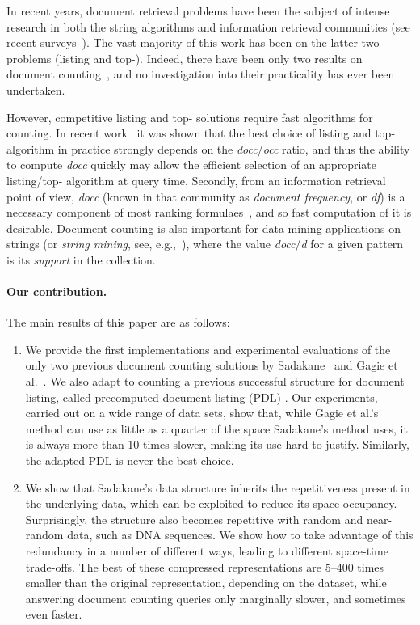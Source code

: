 \documentclass[11pt]{llncs}
\begin{document}
In recent years, document retrieval problems have been the subject of intense research in both the
string algorithms and information retrieval communities (see recent surveys~\cite{HPSTV13,NavACMcs14}). The vast majority of this work has been on the latter two problems (listing and top-). 
Indeed, there have been only two results on document counting~\cite{Sad07,GKNPS13}, and no investigation 
into their practicality has ever been undertaken.

However, competitive listing and top- solutions require fast algorithms for
counting. In recent work~\cite{NPS2014} it was shown that the best choice of listing and top- algorithm in 
practice strongly depends on the {\em docc}/{\em occ} ratio, and thus the ability to compute {\em docc} quickly 
may allow the efficient selection of an appropriate listing/top- algorithm at query time. Secondly, 
from an information retrieval point of view, {\em docc} (known in that community as {\em document frequency}, 
or {\em df}) is a necessary component of most ranking formulaes~\cite{ZM1998,BCC10,CMS09}, and so 
fast computation of it is desirable. Document counting is also important for data mining applications on strings 
(or {\em string mining}, see, e.g.,~\cite{FMV2008,DPT2012}), where the value {\em docc}/{\em d} for a 
given pattern is its {\em support} in the collection.

\paragraph{Our contribution.} The main results of this paper are as follows:
\begin{enumerate}
\item We provide the first implementations and experimental evaluations of the only two previous document counting
solutions by Sadakane~\cite{Sad07} and Gagie et al.~\cite{GKNPS13}. We also 
adapt to counting a previous successful structure for document listing, called
precomputed document listing (PDL)
\cite{NPS2014}. Our experiments, carried out on a wide range of data
sets, show that, while Gagie et al.'s method can use as little as a quarter of the space Sadakane's method uses,
it is always more than 10 times slower, making its use hard to justify.
Similarly, the adapted PDL is never the best choice.
\item We show that Sadakane's data structure inherits the repetitiveness present in the underlying data, which can  be exploited to reduce its space occupancy.
Surprisingly, the structure also becomes repetitive with random and near-random data, such as DNA sequences.
We show how to take advantage of this redundancy in a number of 
different ways, leading to different space-time trade-offs.
The best of these compressed representations are 5--400 times smaller than the original representation, depending on the dataset, while answering document counting queries only marginally slower, and sometimes even faster.
\end{enumerate}
\end{document}
